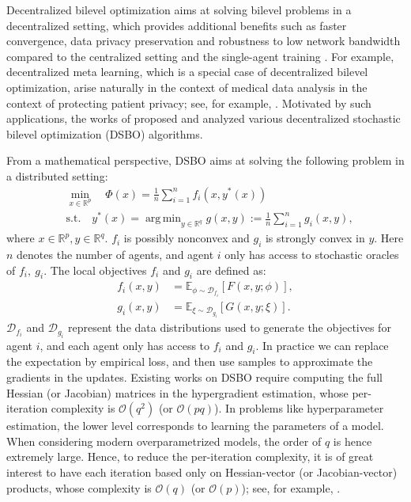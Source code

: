 \documentclass{article}
\theoremstyle{plain}
\theoremstyle{definition}
\theoremstyle{remark}
\DeclareMathOperator*{\argmin}{arg\,min}
\newcommand{\R}{\mathbb{R}}
\newcommand{\cD}{\mathcal{D}}
\newcommand{\cO}{\mathcal{O}}
\begin{document}
Decentralized bilevel optimization aims at solving bilevel problems in a decentralized setting, which provides additional benefits such as faster convergence, data privacy preservation and robustness to low network bandwidth compared to the centralized setting and the single-agent training \citep{lian2017can}. For example, decentralized meta learning, which is a special case of decentralized bilevel optimization, arise naturally in the context of medical data analysis in the context of protecting patient privacy; see, for example, \citet{altae2017low, zhang2019metapred, kayaalp2022dif}. Motivated by such applications, the works of \citet{lu2022decentralized, chen2022decentralized, yang2022decentralized, gao2022stochastic} proposed and analyzed various decentralized stochastic bilevel optimization (DSBO) algorithms.

From a mathematical perspective, DSBO aims at solving the following problem in a distributed setting:
\begin{equation}\label{eq: dsbo_opt}
    \begin{aligned}
        &\min_{x\in\R^p}\quad \Phi(x) = \frac{1}{n}\sum_{i=1}^{n}f_i(x,y^*(x)) \\
        &\text{s.t.}\quad y^*(x) = \argmin_{y\in\R^{q}}g(x,y):= \frac{1}{n}\sum_{i=1}^{n}g_i(x,y),
    \end{aligned}
\end{equation}
where $x\in \mathbb{R}^{p}, y\in\mathbb{R}^{q}$. $f_i$ is possibly nonconvex and $g_i$ is strongly convex in $y$. Here $n$ denotes the number of agents, and agent $i$ only has access to stochastic oracles of $f_i,\ g_i$. The local objectives $f_i$ and $g_i$ are defined as:
\begin{align*}
    f_i(x,y) &= \mathbb{E}_{\phi\sim \cD_{f_i}}\left[F(x,y;\phi)\right],\\
    g_i(x,y) &= \mathbb{E}_{\xi\sim \cD_{g_i}}\left[G(x,y;\xi)\right].
\end{align*}
$\cD_{f_i}$ and $\cD_{g_i}$ represent the data distributions used to generate the objectives for agent $i$, and each agent only has access to $f_i$ and $g_i$. In practice we can replace the expectation by empirical loss, and then use samples to approximate the gradients in the updates. Existing works on DSBO require computing the full Hessian (or Jacobian) matrices in the hypergradient estimation, whose per-iteration complexity is $\cO(q^2)$ (or $\cO(pq)$). In problems like hyperparameter estimation, the lower level corresponds to learning the parameters of a model. When considering modern overparametrized models, the order of $q$ is hence extremely large. Hence, to reduce the per-iteration complexity, it is of great interest to have each iteration based only on Hessian-vector (or Jacobian-vector) products, whose complexity is $\cO(q)$ (or $\cO(p)$); see, for example, \citet{pearlmutter1994fast}. 
\end{document}
